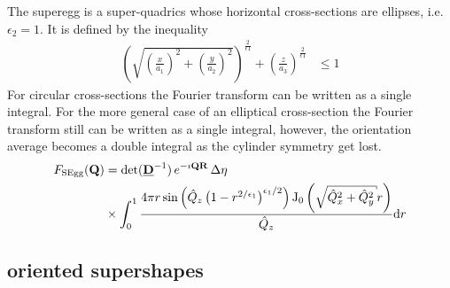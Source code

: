 The superegg is a super-quadrics whose horizontal cross-sections are ellipses, i.e. $\epsilon_2=1$. It is defined by the inequality \cite{WeisssteinSuperEgg}
\begin{align}
\label{eq:superegg_implicit}
   \left(\sqrt{\left(\frac{x}{a_1}\right)^2+\left(\frac{y}{a_2}\right)^2}\right)^{\frac{2}{\epsilon1}} + \left(\frac{z}{a_3}\right)^{\frac{2}{\epsilon1}} & \leq 1
\end{align}
For circular cross-sections the Fourier transform \cite{Maric2017} can be written as a single integral. For the more general case of an elliptical cross-section the Fourier transform still can be written as a single integral, however, the orientation average becomes a double integral as the cylinder symmetry get lost.
\begin{align}
F_\mathrm{SEgg}(\B{Q}) &=
\det(\M{D}^{-1})\, e^{-\imath\B{QR}}\, \Delta\eta\,  \nonumber \\
 &\times \int_0^1 \frac{4 \pi  r \sin \left(\hat{Q}_z \left(1-r^{2/\epsilon_1}\right)^{\epsilon_1/2}\right) \operatorname{J}_0\left(\sqrt{\hat{Q}_x^2+\hat{Q}_y^2}
   r\right)}{\hat{Q}_z} \mathrm{d}r
\end{align}

\subsection{oriented supershapes} 